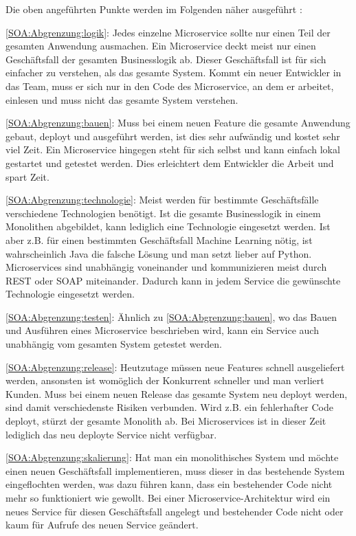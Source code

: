Die oben angeführten Punkte werden im Folgenden näher ausgeführt \cite[Kapitel 1]{MicroservicesForJavaDevelopers}:

\ref{SOA:Abgrenzung:logik}: Jedes einzelne Microservice sollte nur einen Teil der gesamten Anwendung ausmachen. Ein Microservice deckt meist nur einen Geschäftsfall der gesamten Businesslogik ab. Dieser Geschäftsfall ist für sich einfacher zu verstehen, als das gesamte System. Kommt ein neuer Entwickler in das Team, muss er sich nur in den Code des Microservice, an dem er arbeitet, einlesen und muss nicht das gesamte System verstehen.

\ref{SOA:Abgrenzung:bauen}: Muss bei einem neuen Feature die gesamte Anwendung gebaut, deployt und ausgeführt werden, ist dies sehr aufwändig und kostet sehr viel Zeit. Ein Microservice hingegen steht für sich selbst und kann einfach lokal gestartet und getestet werden. Dies erleichtert dem Entwickler die Arbeit und spart Zeit.

\ref{SOA:Abgrenzung:technologie}: Meist werden für bestimmte Geschäftsfälle verschiedene Technologien benötigt. Ist die gesamte Businesslogik in einem Monolithen abgebildet, kann lediglich eine Technologie eingesetzt werden. Ist aber z.B. für einen bestimmten Geschäftsfall Machine Learning nötig, ist wahrscheinlich Java die falsche Lösung und man setzt lieber auf Python.
Microservices sind unabhängig voneinander und kommunizieren meist durch REST oder SOAP miteinander. Dadurch kann in jedem Service die gewünschte Technologie eingesetzt werden.

\ref{SOA:Abgrenzung:testen}: Ähnlich zu \ref{SOA:Abgrenzung:bauen}, wo das Bauen und Ausführen eines Microservice beschrieben wird, kann ein Service auch unabhängig vom gesamten System getestet werden.

\ref{SOA:Abgrenzung:release}: Heutzutage müssen neue Features schnell ausgeliefert werden, ansonsten ist womöglich der Konkurrent schneller und man verliert Kunden. Muss bei einem neuen Release das gesamte System neu deployt werden, sind damit verschiedenste Risiken verbunden. Wird z.B. ein fehlerhafter Code deployt, stürzt der gesamte Monolith ab. Bei Microservices ist in dieser Zeit lediglich das neu deployte Service nicht verfügbar.

\ref{SOA:Abgrenzung:skalierung}: Hat man ein monolithisches System und möchte einen neuen Geschäftsfall implementieren, muss dieser in das bestehende System eingeflochten werden, was dazu führen kann, dass ein bestehender Code nicht mehr so funktioniert wie gewollt.
Bei einer Microservice-Architektur wird ein neues Service für diesen Geschäftsfall angelegt und bestehender Code nicht oder kaum für Aufrufe des neuen Service geändert.

